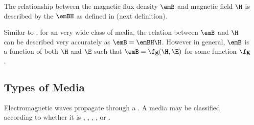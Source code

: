 The relationship between the magnetic flux density $\emB$
and magnetic field $\H$ is described by the  $\emBH$
as defined in  (next definition).

\begin{remark}
   Similar to , for an very wide class of media, the relation between $\emB$ and $\H$
   can be described very accurately as $\emB = \emBH \H$.
   However in general, $\emB$ is a function of both $\H$ and $\E$ such that
   $\emB = \fg(\H,\E)$ for some function $\fg$.
\end{remark}

\begin{definition}
\label{def:bh}
\end{definition}

\subsection{Types of Media}
Electromagnetic waves propagate through a .
A media may be classified according to whether it is , , 
, ,
or .

\begin{definition}
\label{def_simple}
\end{definition}

